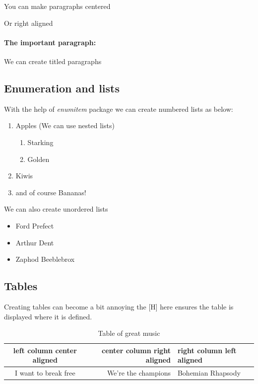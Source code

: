 \documentclass[a4paper, 12pt, titlepage]{article}
\begin{document}
\begin{center}
	You can make paragraphs centered
\end{center}

\begin{flushright}
	Or right aligned
\end{flushright}

\paragraph{The important paragraph:}
We can create titled paragraphs

\subsection{Enumeration and lists}
With the help of \emph{enumitem} package we can create numbered lists as below:

\begin{enumerate}[label=\arabic*]
	\item Apples (We can use nested lists)
	\begin{enumerate}[label=\Alph*)]
		\item Starking
		\item Golden
	\end{enumerate}
	\item Kiwis
	\item and of course Bananas!
\end{enumerate}

We can also create unordered lists
\begin{itemize}
	\item Ford Prefect
	\item Arthur Dent
	\item Zaphod Beeblebrox
\end{itemize}

\subsection{Tables}

Creating tables can become a bit annoying the [H] here ensures the table is displayed where it is defined.

\begin{table}[H]
	\label{table:music}
	\caption{Table of great music}
	\centering
	\begin{tabular}{c | r | l |}
		left column center aligned & center column right aligned & right column left aligned \\ %
		\hline
		\hline %
		\hline
		I want to break free & We're the champions & Bohemian Rhapsody \\
		\hline
	\end{tabular}
\end{table}
\end{document}

